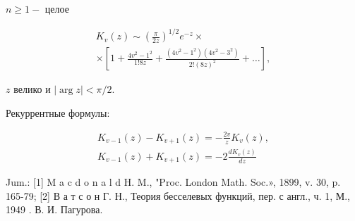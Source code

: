 \documentclass[10pt]{article}
\begin{document}
$n \geqslant 1-$ целое



\[

\begin{gathered}

K_{v}(z) \sim\left(\frac{\pi}{2 z}\right)^{1 / 2} e^{-z} \times \\

\times\left[1+\frac{4 v^{2}-1^{2}}{1 ! 8 z}+\frac{\left(4 v^{2}-1^{2}\right)\left(4 v^{2}-3^{2}\right)}{2 !(8 z)^{2}}+\ldots\right],

\end{gathered}

\]



$z$ велико и $|\arg z|<\pi / 2$.



Рекуррентные формулы:



\[

\begin{gathered}

K_{v-1}(z)-K_{v+1}(z)=-\frac{2 v}{z} K_{v}(z), \\

K_{v-1}(z)+K_{v+1}(z)=-2 \frac{d K_{v}(z)}{d z}

\end{gathered}

\]



Jum.: [1] M a c d o n a l d H. M., "Proc. London Math. Soc.», 1899, v. 30, p. 165-79; [2] В а т с о н Г. Н., Теория бесселевых функций, пер. с англ., ч. 1, М., 1949 . В. И. Пагурова.
\end{document}
